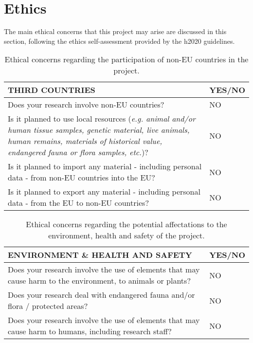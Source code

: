 \section{Ethics}
The main ethical concerns that this project may arise are discussed in this section, following the ethics self-assessment provided by the h2020 guidelines.

\begin{table}[H]
	\centering
	\begin{tabular}[H]{>{\arraybackslash}p{10cm}
					   >{\arraybackslash}p{3cm} }
		\toprule[2pt]
		
		\textbf{THIRD COUNTRIES} & \textbf{YES/NO} \\
		\midrule[1.5pt]
		Does your research involve non-EU countries? & NO\\
		Is it planned to use local resources (\textit{e.g. animal and/or human tissue samples, genetic material, live animals, human remains, materials of historical value, endangered fauna or flora samples, etc.})? & NO\\
		Is it planned to import any material - including personal data - from non-EU countries into the EU? & NO\\
		Is it planned to export any material - including personal data - from the EU to non-EU countries? & NO\\
		\bottomrule[2pt]		
	\end{tabular}
	\caption[Ethics - Non-EU countries]{Ethical concerns regarding the participation of non-EU countries in the project.}
	\label{Ethics_Third_Countries}
\end{table}

\begin{table}[H]
	\centering
	\begin{tabular}[H]{>{\arraybackslash}p{10cm}
			>{\arraybackslash}p{3cm} }
		\toprule[2pt]
		
		\textbf{ENVIRONMENT \& HEALTH AND SAFETY} & \textbf{YES/NO} \\
		\midrule[1.5pt]
		Does your research involve the use of elements that may cause harm to the environment, to animals or plants? & NO\\
		Does your research deal with endangered fauna and/or flora / protected areas? & NO \\
		Does your research involve the use of elements that may cause harm to humans, including research staff? & NO \\
		\bottomrule[2pt]		
	\end{tabular}
	\caption[Ethics - Environment, health and safety]{Ethical concerns regarding the potential affectations to the environment, health and safety of the project.}
	\label{Ethics_Environment}
\end{table}

